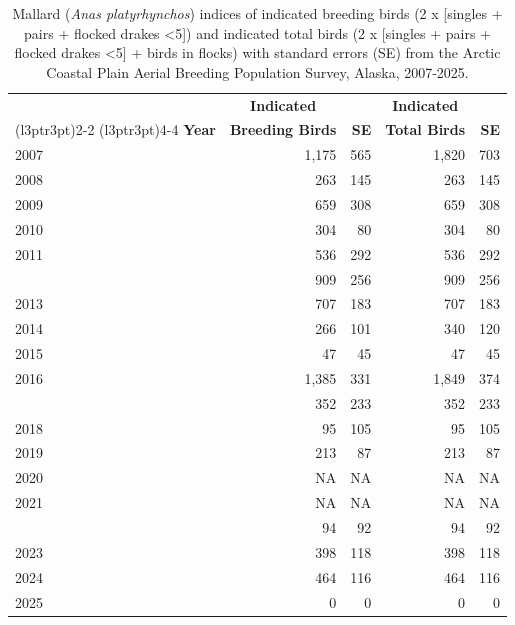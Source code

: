 \documentclass[
]{article}
\begin{document}
\begin{longtable}[t]{lrrrr}

\caption{\label{tbl-MALL}Mallard (\emph{Anas platyrhynchos}) indices of
indicated breeding birds (2 x {[}singles + pairs + flocked drakes
\textless5{]}) and indicated total birds (2 x {[}singles + pairs +
flocked drakes \textless5{]} + birds in flocks) with standard errors
(SE) from the Arctic Coastal Plain Aerial Breeding Population Survey,
Alaska, 2007-2025.}

\tabularnewline

\\
\toprule
\multicolumn{1}{c}{\textbf{ }} & \multicolumn{1}{c}{\textbf{Indicated}} & \multicolumn{1}{c}{\textbf{ }} & \multicolumn{1}{c}{\textbf{Indicated}} & \multicolumn{1}{c}{\textbf{ }} \\
\cmidrule(l{3pt}r{3pt}){2-2} \cmidrule(l{3pt}r{3pt}){4-4}
\textbf{Year} & \textbf{Breeding Birds} & \textbf{SE} & \textbf{Total Birds} & \textbf{SE}\\
\midrule
2007 & 1,175 & 565 & 1,820 & 703\\
2008 & 263 & 145 & 263 & 145\\
2009 & 659 & 308 & 659 & 308\\
2010 & 304 & 80 & 304 & 80\\
2011 & 536 & 292 & 536 & 292\\
\addlinespace
2012 & 909 & 256 & 909 & 256\\
2013 & 707 & 183 & 707 & 183\\
2014 & 266 & 101 & 340 & 120\\
2015 & 47 & 45 & 47 & 45\\
2016 & 1,385 & 331 & 1,849 & 374\\
\addlinespace
2017 & 352 & 233 & 352 & 233\\
2018 & 95 & 105 & 95 & 105\\
2019 & 213 & 87 & 213 & 87\\
2020 & NA & NA & NA & NA\\
2021 & NA & NA & NA & NA\\
\addlinespace
2022 & 94 & 92 & 94 & 92\\
2023 & 398 & 118 & 398 & 118\\
2024 & 464 & 116 & 464 & 116\\
2025 & 0 & 0 & 0 & 0\\
\bottomrule

\end{longtable}

\endgroup{}
\end{document}
